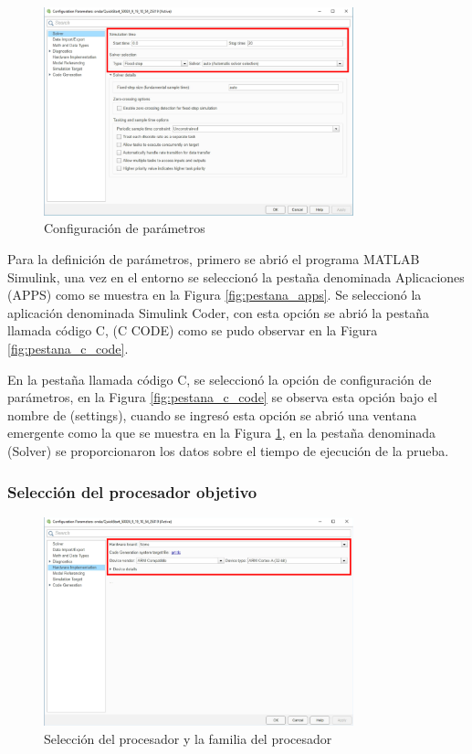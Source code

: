 \begin{figure}[h!]
    \centering
    \includegraphics[width=0.8\textwidth]{fig/especifico_2/M2MT/paso_a_paso_mtmt/configuration_parameters.pdf}
    \caption{Configuración de parámetros}
    \label{fig:pestana_config}
\end{figure}


Para la definición de parámetros, primero se abrió el programa MATLAB Simulink, una vez en el entorno se seleccionó la pestaña denominada Aplicaciones (APPS) como se muestra en la Figura \ref{fig:pestana_apps}. Se seleccionó la aplicación denominada Simulink Coder, con esta opción se abrió la pestaña llamada código C, (C CODE) como se pudo observar en la Figura \ref{fig:pestana_c_code}.

En la pestaña llamada código C, se seleccionó la opción de configuración de parámetros, en la Figura \ref{fig:pestana_c_code} se observa esta opción bajo el nombre de (settings), cuando se ingresó esta opción se abrió una ventana emergente como la que se muestra en la Figura \ref{fig:pestana_config}, en la pestaña denominada (Solver) se proporcionaron los datos sobre el tiempo de ejecución de la prueba.
 \newpage
\subsubsection{Selección del procesador objetivo}

\begin{figure}[h!]
    \centering
    \includegraphics[width=0.8\textwidth]{fig/especifico_2/M2MT/paso_a_paso_mtmt/configuration_parameters_processor.pdf}
    \caption{Selección del procesador y la familia del procesador}
    \label{fig:pestana_config_procesador}
\end{figure}

